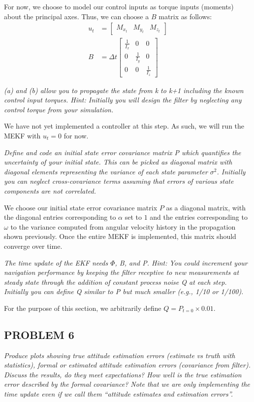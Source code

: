 For now, we choose to model our control inputs as torque inputs (moments) about the principal axes. Thus, we can choose a $B$ matrix as follows:
\begin{align*}
    u_{t} &= \begin{bmatrix}
        M_{x_{t}} & M_{y_{t}} & M_{z_{t}}
    \end{bmatrix} \\
    B &= \Delta t \begin{bmatrix}
        \frac{1}{I_{x}} & 0 & 0 \\
        0 & \frac{1}{I_{y}} & 0 \\
        0 & 0 & \frac{1}{I_{z}}
    \end{bmatrix}
\end{align*}

\textit{(a) and (b) allow you to propagate the state from k to k+1 including the known control input torques. Hint: Initially you will design the filter by neglecting any control torque from your simulation.}

We have not yet implemented a controller at this step. As such, we will run the MEKF with $u_{t} = 0$ for now.

\textit{Define and code an initial state error covariance matrix P which quantifies the uncertainty of your initial state. This can be picked as diagonal matrix with diagonal elements representing the variance of each state parameter $\sigma^{2}$. Initially you can neglect cross-covariance terms assuming that errors of various state components are not correlated.}

We choose our initial state error covariance matrix $P$ as a diagonal matrix, with the diagonal entries corresponding to $\alpha$ set to $1$ and the entries corresponding to $\omega$ to the variance computed from angular velocity history in the propagation shown previously. Once the entire MEKF is implemented, this matrix should converge over time.

\textit{The time update of the EKF needs $\Phi$, B, and P. Hint: You could increment your navigation performance by keeping the filter receptive to new measurements at steady state through the addition of constant process noise Q at each step. Initially you can define Q similar to P but much smaller (e.g., 1/10 or 1/100).}

For the purpose of this section, we arbitrarily define $Q = P_{t=0} \times 0.01$.

\subsection{PROBLEM 6}
\textit{Produce plots showing true attitude estimation errors (estimate vs truth with statistics), formal or estimated attitude estimation errors (covariance from filter). Discuss the results, do they meet expectations? How well is the true estimation error described by the formal covariance? Note that we are only implementing the time update even if we call them “attitude estimates and estimation errors”.}

